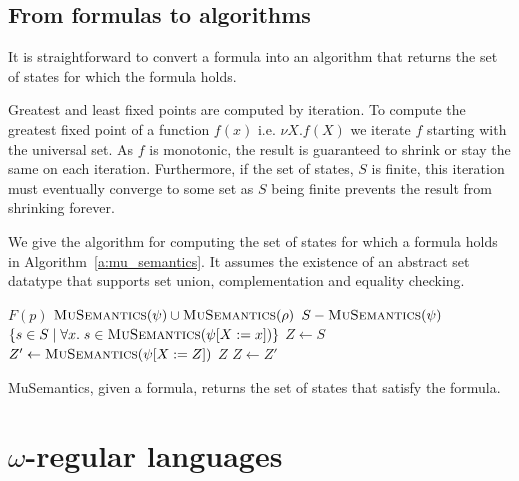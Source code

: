 \subsection{From \mucalc formulas to algorithms}

It is straightforward to convert a \mucalc formula into an algorithm that returns the set of states for which the formula holds.

Greatest and least fixed points are computed by iteration. To compute the greatest fixed point of a function $f(x)$ i.e. $\nu X. f(X)$ we iterate $f$ starting with the universal set. As $f$ is monotonic, the result is guaranteed to shrink or stay the same on each iteration. Furthermore, if the set of states, $S$ is finite, this iteration must eventually converge to some set as $S$ being finite prevents the result from shrinking forever. 

We give the algorithm for computing the set of states for which a \mucalc formula holds in Algorithm~\ref{a:mu_semantics}. It assumes the existence of an abstract set datatype that supports set union, complementation and equality checking.

\begin{algorithm}
\begin{algorithmic}

        \State\Return $F(p)$
    \ElsIf {$\phi = \psi \vee \rho$}
        \State\Return $\Call{MuSemantics}{\psi} \cup \Call{MuSemantics}{\rho}$
    \ElsIf {$\phi = \neg \psi$}
        \State\Return $S - \Call{MuSemantics}{\psi}$
    \State\Return $\{ s \in S \; | \; \forall x. \; s \in \Call{MuSemantics}{\psi[X:=x]} \}$
        \State $Z \gets S$
        \Loop
            \State $Z' \gets \Call{MuSemantics}{\psi[X:=Z]}$
                \State\Return $Z$
            \EndIf
            \State $Z \gets Z'$
        \EndLoop
    \EndIf
\EndFunction

\end{algorithmic}
\caption{MuSemantics, given a \mucalc formula, returns the set of states that satisfy the formula.}
\label{a:mu_semantics}
\end{algorithm}

\section{$\omega$-regular languages}

